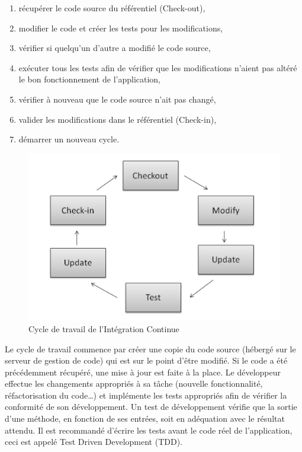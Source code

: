     \begin{enumerate}
      \item récupérer le code source du référentiel (Check-out),
      \item modifier le code et créer les tests pour les modifications,
      \item vérifier si quelqu'un d'autre a modifié le code source,
      \item exécuter tous les tests afin de vérifier que les modifications n’aient pas altéré le bon fonctionnement de l’application,
      \item vérifier à nouveau que le code source n'ait pas changé,
      \item valider les modifications dans le référentiel (Check-in),
      \item démarrer un nouveau cycle.\\
    \end{enumerate}

    \begin{figure}
      \begin{center}
        \includegraphics[scale=0.5]{images/ICWorkflow.png}
      \end{center}
      \caption{Cycle de travail de l’Intégration Continue}
      \label{IC workflow}
    \end{figure}

    Le cycle de travail commence par créer une copie du code source (hébergé sur le serveur de gestion de code) qui est sur le point d'être modifié. Si le code a été précédemment récupéré, une mise à jour est faite à la place. Le développeur effectue les changements appropriés à sa tâche (nouvelle fonctionnalité, réfactorisation du code…) et implémente les tests appropriés afin de vérifier la conformité de son développement. Un test de développement vérifie que la sortie d’une méthode, en fonction de ses entrées, soit en adéquation avec le résultat attendu. Il est recommandé d’écrire les tests avant le code réel de l’application, ceci est appelé Test Driven Development (TDD).\\

